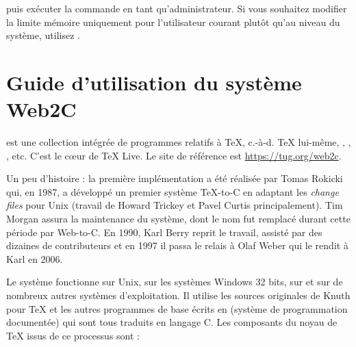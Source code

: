 \documentclass[german, english, french]{article}
\renewcommand{\TL}{\TeX{} Live\xspace}%
\begin{document}
\noindent puis exécuter la commande  en tant
qu'administrateur. Si vous souhaitez modifier la limite mémoire uniquement pour
l'utilisateur courant plutôt qu'au niveau du système, utilisez
.


\section{Guide d'utilisation du système Web2C}

\Webc{} est une collection intégrée de programmes relatifs à \TeX,
c.-à-d. \TeX{} lui-même, \MF{}, \MP, \BibTeX{}, etc.  C'est le cœur de \TL{}. Le
site de référence est \url{https://tug.org/web2c}.

Un peu d'histoire : la première implémentation a été réalisée par Tomas Rokicki
qui, en 1987, a développé un premier système \TeX{}-to-C en adaptant les
\textit{change files} pour Unix (travail de Howard Trickey et Pavel Curtis
principalement).  Tim Morgan assura la maintenance du système, dont le nom fut
remplacé durant cette période par Web-to-C.  En 1990, Karl Berry reprit le
travail, assisté par des dizaines de contributeurs et en 1997 il passa le relais
à Olaf Weber qui le rendit à Karl en 2006.

Le système \Webc{} fonctionne sur Unix, sur les systèmes Windows 32 bits, sur
\MacOSX{} et sur de nombreux autres systèmes d'exploitation.  Il utilise les
sources originales de Knuth pour \TeX{} et les autres programmes de base écrits
en \web{} (système de programmation documentée) qui sont tous traduits en
langage C. Les composants du noyau de \TeX{} issus de ce processus sont :
\end{document}
